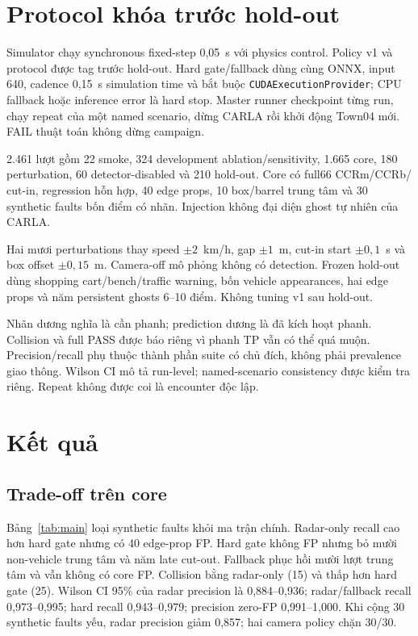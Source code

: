 \documentclass[conference]{IEEEtran}
\begin{document}
\section{Protocol khóa trước hold-out}
Simulator chạy synchronous fixed-step 0,05~s với physics control. Policy v1 và
protocol được tag trước hold-out. Hard gate/fallback dùng cùng ONNX, input 640,
cadence 0,15~s simulation time và bắt buộc \texttt{CUDAExecutionProvider}; CPU
fallback hoặc inference error là hard stop. Master runner checkpoint từng run,
chạy repeat của một named scenario, dừng CARLA rồi khởi động Town04 mới. FAIL
thuật toán không dừng campaign.

2.461 lượt gồm 22 smoke, 324 development ablation/sensitivity, 1.665 core, 180
perturbation, 60 detector-disabled và 210 hold-out. Core có full66 CCRm/CCRb/
cut-in, regression hỗn hợp, 40 edge props, 10 box/barrel trung tâm và 30
synthetic faults bốn điểm có nhãn. Injection không đại diện ghost tự nhiên của
CARLA.

Hai mươi perturbations thay speed $\pm2$~km/h, gap $\pm1$~m, cut-in start
$\pm0,1$~s và box offset $\pm0,15$~m. Camera-off mô phỏng không có detection.
Frozen hold-out dùng shopping cart/bench/traffic warning, bốn vehicle appearances,
hai edge props và năm persistent ghosts 6--10 điểm. Không tuning v1 sau hold-out.

Nhãn dương nghĩa là cần phanh; prediction dương là đã kích hoạt phanh. Collision
và full PASS được báo riêng vì phanh TP vẫn có thể quá muộn. Precision/recall phụ
thuộc thành phần suite có chủ đích, không phải prevalence giao thông. Wilson CI
mô tả run-level; named-scenario consistency được kiểm tra riêng. Repeat không
được coi là encounter độc lập.

\section{Kết quả}
\subsection{Trade-off trên core}
Bảng~\ref{tab:main} loại synthetic faults khỏi ma trận chính. Radar-only recall
cao hơn hard gate nhưng có 40 edge-prop FP. Hard gate không FP nhưng bỏ mười
non-vehicle trung tâm và năm late cut-out. Fallback phục hồi mười lượt trung tâm
và vẫn không có core FP. Collision bằng radar-only (15) và thấp hơn hard gate
(25). Wilson CI 95\% của radar precision là 0,884--0,936; radar/fallback recall
0,973--0,995; hard recall 0,943--0,979; precision zero-FP 0,991--1,000. Khi cộng
30 synthetic faults yếu, radar precision giảm 0,857; hai camera policy chặn
30/30.
\end{document}
